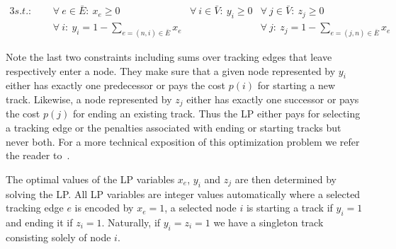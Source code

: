 		\begin{alignat*}{3}
		  s.t.:
		        & \ \     & \forall \ e \in \bar{E} : \ x_{e} \ge 0  \quad \quad    & \forall \ i \in \bar{V} : \ y_{i} \ge 0                                          & \forall \ j \in \bar{V} : \ z_{j} \ge 0                                             \\
		        & \ \     & \forall \ i: \ y_{i} = 1 - \sum_{e = (n,i) \in \bar{E}} x_{e}                                          &                                                     & \forall \ j: \ z_{j} = 1 - \sum_{e = (j,n) \in \bar{E}} x_{e}                     
		\end{alignat*}

		Note the last two constraints including sums over tracking edges that leave respectively enter a node. They make sure that a given node represented by $y_i$ either has exactly one predecessor or pays the cost $p(i)$ for starting a new track. Likewise, a node represented by $z_j$ either has exactly one successor or pays the cost $p(j)$ for ending an existing track. Thus the LP either pays for selecting a tracking edge or the penalties associated with ending or starting tracks but never both. For a more technical exposition of this optimization problem we refer the reader to~\cite{Karrenbauer2013}.

		The optimal values of the LP variables $x_e$, $y_i$ and $z_j$ are then determined by solving the LP. All LP variables are integer values automatically where a selected tracking edge $e$ is encoded by $x_e=1$, a selected node $i$ is starting a track if $y_i=1$ and ending it if $z_i=1$. Naturally, if $y_i=z_i=1$ we have a singleton track consisting solely of node $i$.

